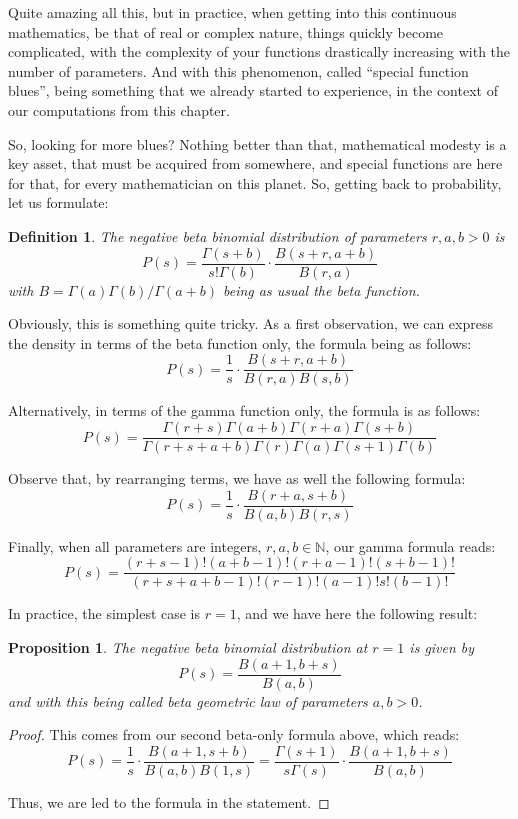 \documentclass[12pt]{amsbook}
\newtheorem{definition}[theorem]{Definition}
\newtheorem{proposition}[theorem]{Proposition}
\begin{document}
Quite amazing all this, but in practice, when getting into this continuous mathematics, be that of real or complex nature, things quickly become complicated, with the complexity of your functions drastically increasing with the number of parameters. And with this phenomenon, called ``special function blues'', being something that we already started to experience, in the context of our computations from this chapter.

\bigskip

So, looking for more blues? Nothing better than that, mathematical modesty is a key asset, that must be acquired from somewhere, and special functions are here for that, for every mathematician on this planet. So, getting back to probability, let us formulate:


\begin{definition}
The negative beta binomial distribution of parameters $r,a,b>0$ is
$$P(s)=\frac{\Gamma(s+b)}{s!\Gamma(b)}\cdot\frac{B(s+r,a+b)}{B(r,a)}$$
with $B=\Gamma(a)\Gamma(b)/\Gamma(a+b)$ being as usual the beta function.
\end{definition}

Obviously, this is something quite tricky. As a first observation, we can express the density in terms of the beta function only, the formula being as follows:
$$P(s)=\frac{1}{s}\cdot\frac{B(s+r,a+b)}{B(r,a)B(s,b)}$$

Alternatively, in terms of the gamma function only, the formula is as follows:
$$P(s)=\frac{\Gamma(r+s)\Gamma(a+b)\Gamma(r+a)\Gamma(s+b)}{\Gamma(r+s+a+b)\Gamma(r)\Gamma(a)\Gamma(s+1)\Gamma(b)}$$

Observe that, by rearranging terms, we have as well the following formula:
$$P(s)=\frac{1}{s}\cdot\frac{B(r+a,s+b)}{B(a,b)B(r,s)}$$

Finally, when all parameters are integers, $r,a,b\in\mathbb N$, our gamma formula reads:
$$P(s)=\frac{(r+s-1)!(a+b-1)!(r+a-1)!(s+b-1)!}{(r+s+a+b-1)!(r-1)!(a-1)!s!(b-1)!}$$

In practice, the simplest case is $r=1$, and we have here the following result:

\begin{proposition}
The negative beta binomial distribution at $r=1$ is given by
$$P(s)=\frac{B(a+1,b+s)}{B(a,b)}$$
and with this being called beta geometric law of parameters $a,b>0$.
\end{proposition}

\begin{proof}
This comes from our second beta-only formula above, which reads:
$$P(s)=\frac{1}{s}\cdot\frac{B(a+1,s+b)}{B(a,b)B(1,s)}=\frac{\Gamma(s+1)}{s\Gamma(s)}\cdot\frac{B(a+1,b+s)}{B(a,b)}$$

Thus, we are led to the formula in the statement.
\end{proof}
\end{document}
